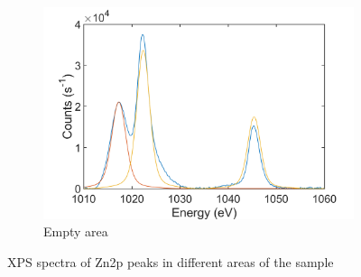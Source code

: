 \begin{figure}[!h]
\begin{center}
		\begin{subfigure}[b]{0.25\textwidth}
			\includegraphics[scale=0.2]{WSe2/WSe2XPSRefZn.png}
			\caption{Empty area}
			\label{fig:WSe2XPSRefZn}
		\end{subfigure}
		\caption{XPS spectra of Zn2p peaks in different areas of the sample}
		\label{fig:WSe2XPSZn}
	\end{center}
\end{figure}


